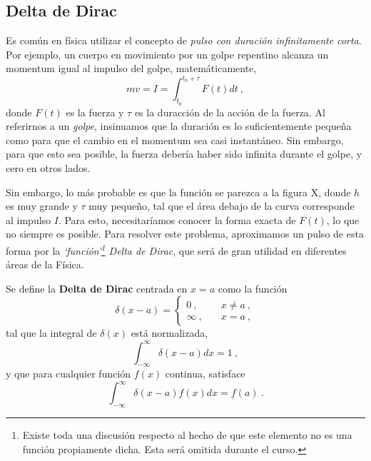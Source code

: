 
\subsection{Delta de Dirac}

Es común en física utilizar el concepto de \emph{pulso con duración infinitamente corta}. Por ejemplo, un cuerpo en movimiento por un golpe repentino alcanza un momentum igual al impulso del golpe, matemáticamente,
\begin{equation*}
    mv = I = \int_{t_0}^{t_0+\tau} F(t) dt \ ,
\end{equation*}
donde $F(t)$ es la fuerza y $\tau$ es la duracción de la acción de la fuerza. Al referirnos a un \emph{golpe}, insinuamos que la duración es lo suficientemente pequeña como para que el cambio en el momentum sea casi instantáneo. Sin embargo, para que esto sea posible, la fuerza debería haber sido infinita durante el golpe, y cero en otros lados.

Sin embargo, lo más probable es que la función se parezca a la figura X, donde $h$ es muy grande y $\tau$ muy pequeño, tal que el área debajo de la curva corresponde al impulso $I$. Para esto, necesitaríamos conocer la forma exacta de $F(t)$, lo que no siempre es posible. Para resolver este problema, aproximamos un pulso de esta forma por la \emph{`función'\footnote{Existe toda una discusión respecto al hecho de que este elemento no es una función propiamente dicha. Esta será omitida durante el curso.} Delta de Dirac}, que será de gran utilidad en diferentes áreas de la Física.

\begin{defi}
    Se define la \textbf{Delta de Dirac} centrada en $x=a$ como la función
    \begin{equation}
        \delta(x-a) = \left\{ \begin{array}{cc}
            0 \ , & \quad x \neq a \ , \\
            \infty \ , & \quad x = a \ ,
        \end{array} \right.
    \end{equation}
    tal que la integral de $\delta(x)$ está normalizada,
    \begin{equation}
        \int_{-\infty}^{\infty} \delta(x-a) dx = 1 \ ,
    \end{equation}
    y que para cualquier función $f(x)$ continua, satisface
    \begin{equation}
        \int_{-\infty}^{\infty} \delta(x-a) f(x) dx = f(a) \ .
    \end{equation}
\end{defi}

